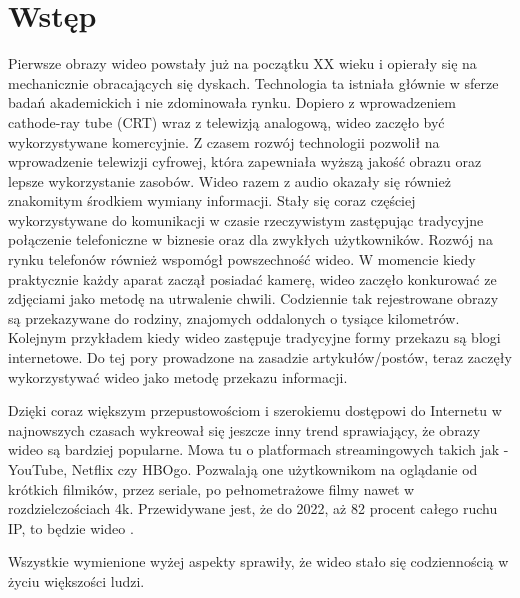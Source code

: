 \chapter{Wstęp}
\label{cha:pierwszyDokument}


Pierwsze obrazy wideo powstały już na początku XX wieku i opierały się na mechanicznie obracających się dyskach. Technologia ta istniała głównie w sferze badań akademickich i nie zdominowała rynku. Dopiero z wprowadzeniem cathode-ray tube (CRT) wraz z telewizją analogową, wideo zaczęło być wykorzystywane komercyjnie. Z czasem rozwój technologii pozwolił na wprowadzenie telewizji cyfrowej, która zapewniała wyższą jakość obrazu oraz lepsze wykorzystanie zasobów. Wideo razem z audio okazały się również znakomitym środkiem wymiany informacji. Stały się coraz częściej wykorzystywane do komunikacji w czasie rzeczywistym zastępując tradycyjne połączenie telefoniczne w biznesie oraz dla zwykłych użytkowników. Rozwój na rynku telefonów również wspomógł powszechność wideo. W momencie kiedy praktycznie każdy aparat zaczął posiadać kamerę, wideo zaczęło konkurować ze zdjęciami jako metodę na utrwalenie chwili. Codziennie tak rejestrowane obrazy są przekazywane do rodziny, znajomych oddalonych o tysiące kilometrów. Kolejnym przykładem kiedy wideo zastępuje tradycyjne formy przekazu są blogi internetowe. Do tej pory prowadzone na zasadzie artykułów/postów, teraz zaczęły wykorzystywać wideo jako metodę przekazu informacji.

Dzięki coraz większym przepustowościom i szerokiemu dostępowi do Internetu w najnowszych czasach wykreował się jeszcze inny trend sprawiający, że obrazy wideo są bardziej popularne. Mowa tu o platformach streamingowych takich jak - YouTube, Netflix czy HBOgo. Pozwalają one użytkownikom na oglądanie od krótkich filmików, przez seriale, po pełnometrażowe filmy nawet w rozdzielczościach 4k. Przewidywane jest, że do 2022, aż 82 procent całego ruchu IP, to będzie wideo \cite{prediction}. \par


Wszystkie wymienione wyżej aspekty sprawiły, że wideo stało się codziennością w życiu większości ludzi.\par {}

